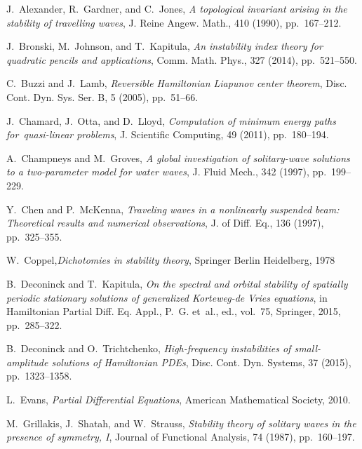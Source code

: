 \documentclass[review,onefignum,onetabnum]{siamart171218}
\begin{document}
\begin{thebibliography}{10}

{\sc J.~Alexander, R.~Gardner, and C.~Jones}, {\em A topological invariant
  arising in the stability of travelling waves}, J. Reine Angew. Math., 410
  (1990), pp.~167--212.

{\sc J.~Bronski, M.~Johnson, and T.~Kapitula}, {\em An instability index theory
  for quadratic pencils and applications}, Comm. Math. Phys., 327 (2014),
  pp.~521--550.

{\sc C.~Buzzi and J.~Lamb}, {\em Reversible {H}amiltonian {L}iapunov center
  theorem}, Disc. Cont. Dyn. Sys. Ser. B, 5 (2005), pp.~51--66.

{\sc J.~Chamard, J.~Otta, and D.~Lloyd}, {\em Computation of minimum energy
  paths for~quasi-linear problems}, J. Scientific Computing, 49 (2011),
  pp.~180--194.

{\sc A.~Champneys and M.~Groves}, {\em A global investigation of solitary-wave
  solutions to a two-parameter model for water waves}, J. Fluid Mech., 342
  (1997), pp.~199--229.

{\sc Y.~Chen and P.~McKenna}, {\em Traveling waves in a nonlinearly suspended
  beam: Theoretical results and numerical observations}, J. of Diff. Eq., 136
  (1997), pp.~325--355.

{\sc W.~Coppel},{\em Dichotomies in stability theory}, Springer Berlin Heidelberg, 1978

{\sc B.~Deconinck and T.~Kapitula}, {\em On the spectral and orbital stability
  of spatially periodic stationary solutions of generalized {K}orteweg-de
  {V}ries equations}, in Hamiltonian Partial Diff. Eq. Appl., P.~G. et~al.,
  ed., vol.~75, Springer, 2015, pp.~285--322.

{\sc B.~Deconinck and O.~Trichtchenko}, {\em High-frequency instabilities of
  small-amplitude solutions of {H}amiltonian {PDE}s}, Disc. Cont. Dyn. Systems,
  37 (2015), pp.~1323--1358.

{\sc L.~Evans}, {\em Partial Differential Equations}, American Mathematical Society, 2010.

{\sc M.~Grillakis, J.~Shatah, and W.~Strauss}, {\em Stability theory of
  solitary waves in the presence of symmetry, {I}}, Journal of Functional
  Analysis, 74 (1987), pp.~160--197.


\end{thebibliography}
\end{document}
